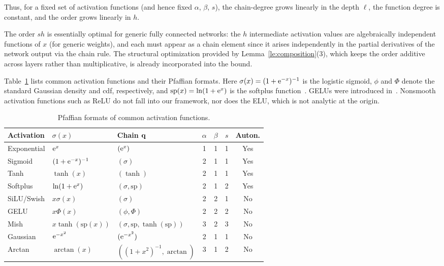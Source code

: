 Thus, for a fixed set of activation functions (and hence fixed $\alpha$, $\beta$, $s$), the chain-degree grows linearly in the depth $\ell$, the function degree is constant, and the order grows linearly in $h$.

\begin{remark}\label{re:chain-length-tight}
The order $sh$ is essentially optimal for generic fully connected networks: the $h$ intermediate activation values are algebraically independent functions of $x$ (for generic weights), and each must appear as a chain element since it arises independently in the partial derivatives of the network output via the chain rule. The structural optimization provided by Lemma~\ref{le:composition}(3), which keeps the order additive across layers rather than multiplicative, is already incorporated into the bound.
\end{remark}

\begin{example}\label{ex:activations}
Table~\ref{tab:activations} lists common activation functions and their Pfaffian formats. Here $\sigma(x)=(1+\mathrm{e}^{-x})^{-1}$ is the logistic sigmoid, $\phi$ and $\Phi$ denote the standard Gaussian density and cdf, respectively, and $\mathrm{sp}(x)=\ln(1+\mathrm{e}^x)$ is the softplus function~\cite{glorot2011deep}. GELUs were introduced in~\cite{hendrycks2016gaussian}. Nonsmooth activation functions such as ReLU do not fall into our framework, nor does the ELU, which is not analytic at the origin.

\begin{table}[h!]
  \centering
  \begin{tabular}{lllcccc}
    \toprule
    Activation & $\sigma(x)$ & Chain $\mathbf{q}$ & $\alpha$ & $\beta$ & $s$ & Auton.\\
    \midrule
    Exponential & $\mathrm{e}^x$ & $(\mathrm{e}^x)$ & 1 & 1 & 1 & Yes \\
    Sigmoid & $(1+\mathrm{e}^{-x})^{-1}$ & $(\sigma)$ & 2 & 1 & 1 & Yes \\
    Tanh & $\tanh(x)$ & $(\tanh)$ & 2 & 1 & 1 & Yes \\
    Softplus & $\ln(1+\mathrm{e}^x)$ & $(\sigma,\mathrm{sp})$ & 2 & 1 & 2 & Yes \\
    SiLU/Swish & $x\sigma(x)$ & $(\sigma)$ & 2 & 2 & 1 & No \\
    GELU & $x\Phi(x)$ & $(\phi,\Phi)$ & 2 & 2 & 2 & No \\
    Mish & $x\tanh(\mathrm{sp}(x))$ & $(\sigma,\mathrm{sp},\tanh(\mathrm{sp}))$ & 3 & 2 & 3 & No \\
    Gaussian & $\mathrm{e}^{-x^2}$ & $(\mathrm{e}^{-x^2})$ & 2 & 1 & 1 & No \\
    Arctan & $\arctan(x)$ & $((1+x^2)^{-1},\arctan)$ & 3 & 1 & 2 & No \\
    \bottomrule
  \end{tabular}
  \caption{Pfaffian formats of common activation functions.}
  \label{tab:activations}
\end{table}
\end{example}


